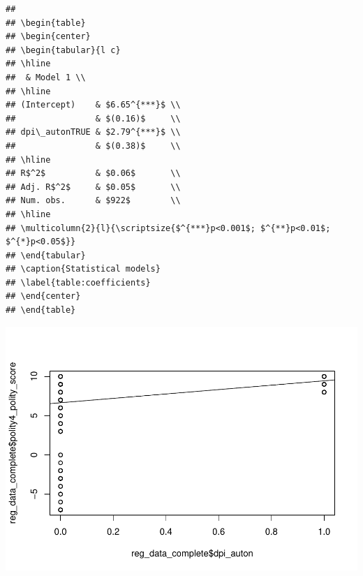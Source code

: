 \documentclass[
]{article}
\newenvironment{Shaded}{\begin{snugshade}}{\end{snugshade}}
\newcommand{\DataTypeTok}[1]{\textcolor[rgb]{0.13,0.29,0.53}{#1}}
\newcommand{\KeywordTok}[1]{\textcolor[rgb]{0.13,0.29,0.53}{\textbf{#1}}}
\newcommand{\NormalTok}[1]{#1}
\newcommand{\OperatorTok}[1]{\textcolor[rgb]{0.81,0.36,0.00}{\textbf{#1}}}
\begin{document}
\begin{verbatim}
## 
## \begin{table}
## \begin{center}
## \begin{tabular}{l c}
## \hline
##  & Model 1 \\
## \hline
## (Intercept)    & $6.65^{***}$ \\
##                & $(0.16)$     \\
## dpi\_autonTRUE & $2.79^{***}$ \\
##                & $(0.38)$     \\
## \hline
## R$^2$          & $0.06$       \\
## Adj. R$^2$     & $0.05$       \\
## Num. obs.      & $922$        \\
## \hline
## \multicolumn{2}{l}{\scriptsize{$^{***}p<0.001$; $^{**}p<0.01$; $^{*}p<0.05$}}
## \end{tabular}
## \caption{Statistical models}
## \label{table:coefficients}
## \end{center}
## \end{table}
\end{verbatim}

\begin{Shaded}
\end{Shaded}

\includegraphics{05_tjbrailey_summary_statistics_files/figure-latex/unnamed-chunk-4-1.pdf}
\end{document}

